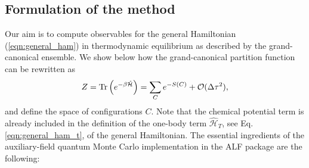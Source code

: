 \subsection{Formulation of the method}  \label{sec:method}
Our aim is to compute observables  for the general Hamiltonian  (\ref{eqn:general_ham}) in
 thermodynamic equilibrium as described by the grand-canonical ensemble.
We show below  how the grand-canonical partition function can be rewritten as 
\begin{equation}
Z = \mathop{\mathrm{Tr}}{\left(e^{-\beta \hat{\mathcal{H}} }\right)}
= \sum_{C} e^{-S(C) } + \mathcal{O}(\Delta\tau^{2}),
\end{equation}
and define the space of configurations  $C$. Note that the chemical potential term is already included in the definition of the one-body term ${\mathcal{\hat{H}}_{T}}$, see Eq. \eqref{eqn:general_ham_t}, of the general Hamiltonian.  
The essential ingredients of the auxiliary-field quantum Monte Carlo implementation in the ALF package are the following:
